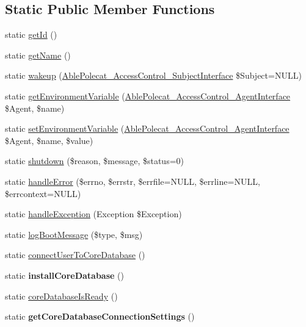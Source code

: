 \subsection*{Static Public Member Functions}
\begin{DoxyCompactItemize}
\item 
static \hyperlink{class_able_polecat___mode___server_acfaa3a96d0cb5a4c0d4d710dcba41e9e}{get\+Id} ()
\item 
static \hyperlink{class_able_polecat___mode___server_a4ef9bd37ba3ce8a13c1e8bcf4f72a630}{get\+Name} ()
\item 
static \hyperlink{class_able_polecat___mode___server_a3f2135f6ad45f51d075657f6d20db2cd}{wakeup} (\hyperlink{interface_able_polecat___access_control___subject_interface}{Able\+Polecat\+\_\+\+Access\+Control\+\_\+\+Subject\+Interface} \$Subject=N\+U\+L\+L)
\item 
static \hyperlink{class_able_polecat___mode___server_a04e7e0f41da8037ae797868b61b6df77}{get\+Environment\+Variable} (\hyperlink{interface_able_polecat___access_control___agent_interface}{Able\+Polecat\+\_\+\+Access\+Control\+\_\+\+Agent\+Interface} \$Agent, \$name)
\item 
static \hyperlink{class_able_polecat___mode___server_a68bdefd00518f09963ea3fa95cd2a242}{set\+Environment\+Variable} (\hyperlink{interface_able_polecat___access_control___agent_interface}{Able\+Polecat\+\_\+\+Access\+Control\+\_\+\+Agent\+Interface} \$Agent, \$name, \$value)
\item 
static \hyperlink{class_able_polecat___mode___server_a55c20682b992aa8250b1d03f03f58385}{shutdown} (\$reason, \$message, \$status=0)
\item 
static \hyperlink{class_able_polecat___mode___server_aefd1705bf4d05f2c642eaeb400639367}{handle\+Error} (\$errno, \$errstr, \$errfile=N\+U\+L\+L, \$errline=N\+U\+L\+L, \$errcontext=N\+U\+L\+L)
\item 
static \hyperlink{class_able_polecat___mode___server_a7e7be427ff1899a7386be4019db2d59d}{handle\+Exception} (Exception \$Exception)
\item 
static \hyperlink{class_able_polecat___mode___server_a049626e8b9364098553ee05897b55111}{log\+Boot\+Message} (\$type, \$msg)
\item 
static \hyperlink{class_able_polecat___mode___server_aa493f0ac5633a2902787572680d5a12a}{connect\+User\+To\+Core\+Database} ()
\item 
\hypertarget{class_able_polecat___mode___server_a17dc1fc2ae198aa7adc290bd3d3f997f}{}static {\bfseries install\+Core\+Database} ()\label{class_able_polecat___mode___server_a17dc1fc2ae198aa7adc290bd3d3f997f}

\item 
static \hyperlink{class_able_polecat___mode___server_aa36943133d0afdd8efe4a026c3eec1b5}{core\+Database\+Is\+Ready} ()
\item 
\hypertarget{class_able_polecat___mode___server_a2eb991ebefbf1af0a620cdc6c109bf60}{}static {\bfseries get\+Core\+Database\+Connection\+Settings} ()\label{class_able_polecat___mode___server_a2eb991ebefbf1af0a620cdc6c109bf60}

\end{DoxyCompactItemize}
